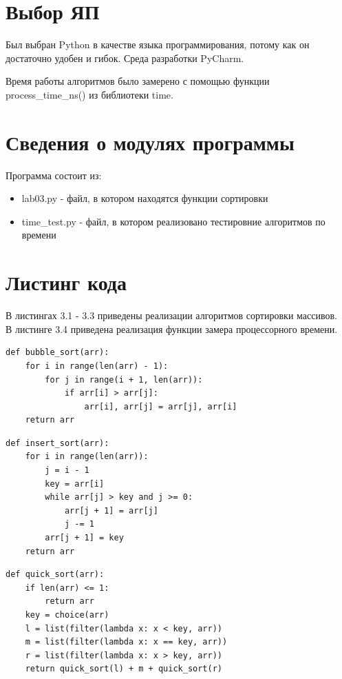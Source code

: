 \documentclass[12pt]{report}
\begin{document}
\section{Выбор ЯП}
Был  выбран Python в качестве языка программирования, потому как он достаточно удобен и гибок. Среда разработки PyCharm.

Время работы алгоритмов было замерено с помощью функции process\_time\_ns() из библиотеки time.

\section{Сведения о модулях программы}
Программа состоит из:
\begin{itemize}
	\item lab03.py - файл, в котором находятся функции сортировки
	\item time\_test.py - файл, в котором реализовано тестировние алгоритмов по времени
\end{itemize}

\section{Листинг кода}

В листингах 3.1 - 3.3 приведены реализации алгоритмов сортировки массивов.\\
В листинге  3.4 приведена реализация функции замера процессорного времени.

\begin{lstlisting}[label=some-code,caption=Сортировка пузырьком]
def bubble_sort(arr):
	for i in range(len(arr) - 1):
		for j in range(i + 1, len(arr)):
			if arr[i] > arr[j]:
				arr[i], arr[j] = arr[j], arr[i]
	return arr
\end{lstlisting}

\begin{lstlisting}[label=some-code,caption=Сортировка вставками]
def insert_sort(arr):
	for i in range(len(arr)):
		j = i - 1
		key = arr[i]
		while arr[j] > key and j >= 0:
			arr[j + 1] = arr[j]
			j -= 1
		arr[j + 1] = key
	return arr
\end{lstlisting}

\begin{lstlisting}[label=some-code,caption=Быстрая сортировка]
def quick_sort(arr):
	if len(arr) <= 1:
		return arr
	key = choice(arr)
	l = list(filter(lambda x: x < key, arr))
	m = list(filter(lambda x: x == key, arr))
	r = list(filter(lambda x: x > key, arr))
	return quick_sort(l) + m + quick_sort(r)
\end{lstlisting}
\end{document}
